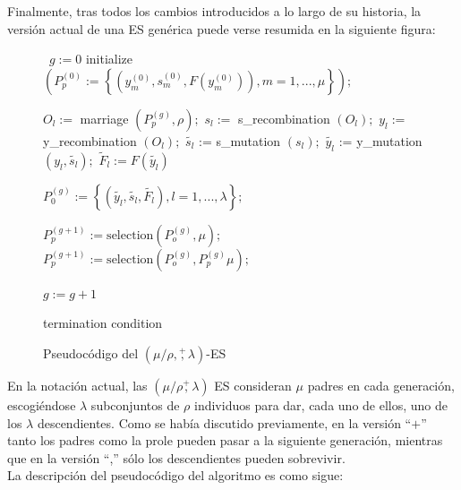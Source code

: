 \documentclass[12pt]{article} \usepackage[utf8x]{inputenc}
\begin{document}
Finalmente, tras todos los cambios introducidos a lo largo de su
historia, la versión actual de una ES genérica puede verse resumida en la
siguiente figura:

\begin{figure}
  \begin{algorithm}[H]
    \begin{algorithmic}[1]
      \label{ES-alg}
      \,
      \State $g := 0$
      \State initialize $\left( P_p^{(0)} := \left\{ \left(y_m^{(0)},
            s_m^{(0)}, F(y_m^{(0)}) \right), m = 1, ..., \mu \right\}
      \right);$
      \Repeat

      \State $O_l :=$ marriage $\left( P_p^{(g)}, \rho \right);$
      \State $s_l :=$ s\_recombination $\left( O_l \right);$
      \State $y_l :=$ y\_recombination $\left( O_l \right);$
      \State $\tilde{s_l}$ := s\_mutation $\left( s_l \right);$
      \State $\tilde{y_l}$ := y\_mutation $\left( y_l, \tilde{s_l} \right);$
      \State $\tilde{F}_l := F(\tilde{y_l})$
      \EndFor

      \State $P_0^{(g)} := \left\{ \left( \tilde{y_l}, \tilde{s_l},
          \tilde{F_l} \right), l = 1, ..., \lambda \right\};$

      \State $P_p^{(g+1)} := \mathrm{selection} \left( P_o^{(g)}, \mu \right);$
      \State $P_p^{(g+1)} := \mathrm{selection} \left( P_o^{(g)}, P_p^{(g)} \mu \right);$
      \EndIf

      \State $g := g + 1$

      \Until termination condition
      \EndProcedure
    \end{algorithmic}
  \end{algorithm}
  \caption{Pseudocódigo del $\left( \mu / \rho, \overset{+}{,} \lambda \right)$-ES \cite{paper-es-salva}}
\end{figure}

En la notación actual, las $(\mu / \rho \overset{+}{,} \lambda)$ ES consideran $\mu$ padres en cada generación, escogiéndose $\lambda$ subconjuntos de $\rho$ individuos para dar, cada uno de ellos, uno de los $\lambda$ descendientes. Como se había discutido previamente, en la versión ``$+$'' tanto los padres como la prole pueden pasar a la siguiente generación, mientras que en la versión ``,'' sólo los descendientes pueden sobrevivir. \\

La descripción del pseudocódigo del algoritmo es como sigue:
\end{document}
